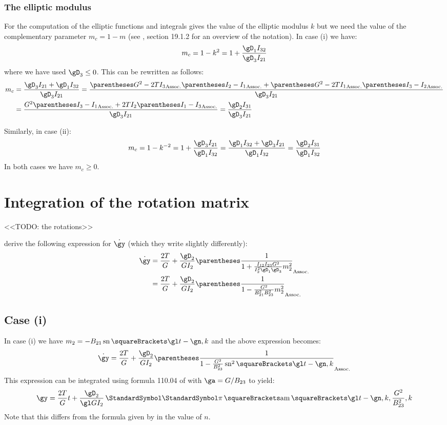 \documentclass[10pt, a4paper, twoside]{basestyle}
\begin{document}
\subsubsection*{The elliptic modulus}
For the computation of the elliptic functions and integrals \cite{Celledoni2007} gives the value of the elliptic modulus $k$ but we need the value of
the complementary parameter $m_c = 1 - m$ (see \cite{NistHMF2010}, section 19.1.2 for an overview of the notation).  In case (i) we have:
\[
m_c = 1 - k^2 = 1 + \frac{\gD_1 I_{32}}{\gD_3 I_{21}}
\]
where we have used $\gD_3 \leq 0$.  This can be rewritten as follows:
\begin{align*}
m_c &= \frac{\gD_3 I_{21} + \gD_1 I_{32}}{\gD_3 I_{21}}
=\frac{\pa{G^2 - 2 T I_3}\pa{I_2 - I_1} + \pa{G^2 - 2 T I_1}\pa{I_3 - I_2}}{\gD_3 I_{21}} \\
&=\frac{G^2\pa{I_3 - I_1} + 2 T I_2\pa{I_1 - I_3}}{\gD_3 I_{21}}
=\frac{\gD_2 I_{31}}{\gD_3 I_{21}}
\end{align*}

Similarly, in case (ii):
\[
m_c = 1 - k^{-2} = 1 + \frac{\gD_3 I_{21}}{\gD_1 I_{32}}
=\frac{\gD_1 I_{32} + \gD_3 I_{21}}{\gD_1 I_{32}}
=\frac{\gD_2 I_{31}}{\gD_1 I_{32}}
\]
In both cases we have $m_c \geq 0$.

\section*{Integration of the rotation matrix}
<<TODO: the rotations>>

\cite{Celledoni2007} derive the following expression for $\TimeDerivative{\gy}$ (which they write slightly differently):
\begin{align*}
\TimeDerivative{\gy} &= \frac{2 T}{G} + \frac{\gD_2}{G I_2}\pa{\frac{1}{1 + \frac{I_{12}I_{23}G^2}{I_2^2 \gD_1 \gD_3}m_2^2}}\\
&= \frac{2 T}{G} + \frac{\gD_2}{G I_2}\pa{\frac{1}{1 - \frac{G^2}{B_{21}^2 B_{23}^2}m_2^2}}
\end{align*}

\subsection*{Case (i)}
In case (i) we have $m_2 = -B_{21} \JacobiSN\of{\gl t - \gn, k}$ and the above expression becomes:
\[
\TimeDerivative{\gy} = \frac{2 T}{G} + \frac{\gD_2}{G I_2}\pa{\frac{1}{1 - \frac{G^2}{B_{23}^2}\JacobiSN^2\of{\gl t - \gn, k}}}
\]
This expression can be integrated using formula 110.04 of \cite{ByrdFriedman1954} with $\ga = G/B_{23}$ to yield:
\[
\gy = \frac{2 T}{G}t + \frac{\gD_2}{\gl G I_2}\EllipticPi\of{\JacobiAmplitude\of{\gl t - \gn, k}, \frac{G^2}{B_{23}^2}, k}
\]
Note that this differs from the formula given by \cite{Celledoni2007} in the value of $n$.
\end{document}
